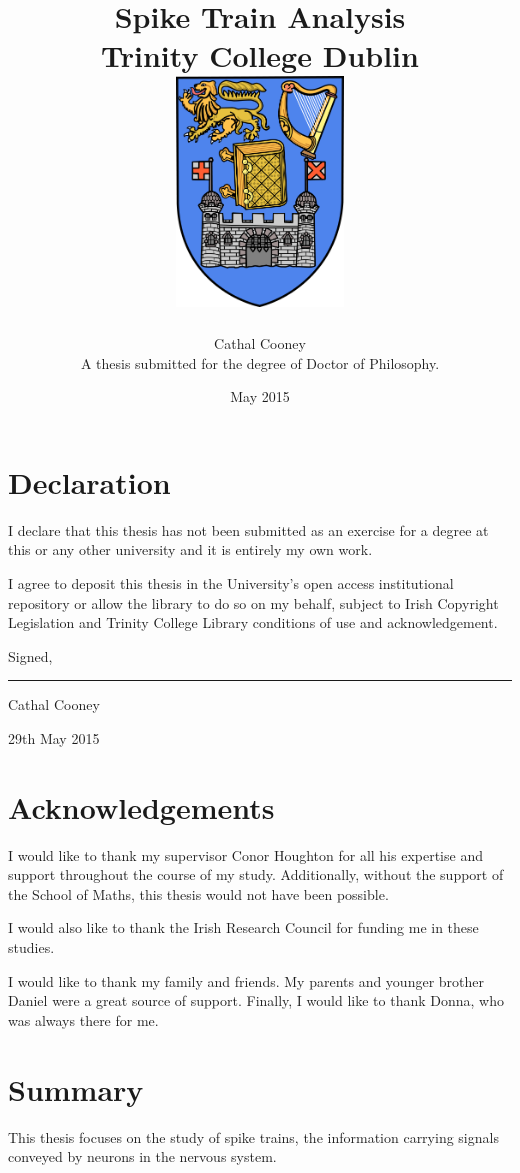 \documentclass[twoside,12pt]{report}
\title{
	{Spike Train Analysis} \\
	{\large Trinity College Dublin} \bigskip\\
	{\includegraphics[width=1.75in]{tcd.png}}
}
\author{Cathal Cooney\\ \bigskip A thesis submitted for the degree of Doctor of Philosophy.}
\date{May 2015}
\begin{document}
\maketitle
\cleardoublepage
%
%
\chapter*{Declaration}
I declare that this thesis has not been submitted as an exercise for a degree at this or any other university and it is entirely my own work.

\bigskip
I agree to deposit this thesis in the University's open access institutional repository or allow the library to do so on my behalf, subject to Irish Copyright Legislation and Trinity College Library conditions of use and acknowledgement.

\bigskip

\bigskip

\bigskip

Signed,

\bigskip

\bigskip

\rule{20em}{0.5pt}

Cathal Cooney

29th May 2015
\cleardoublepage
\chapter*{Acknowledgements}
I would like to thank my supervisor Conor Houghton for all his expertise and support throughout the course of my study.  Additionally, without the support of the School of Maths, this thesis would not have been possible.

I would also like to thank the Irish Research Council for funding me in these studies.

I would like to thank my family and friends.  My parents and younger brother Daniel were a great source of support.  Finally, I would like to thank Donna, who was always there for me.
\cleardoublepage
\chapter*{Summary}
This thesis focuses on the study of spike trains, the information carrying signals conveyed by neurons in the nervous system.
\end{document}

